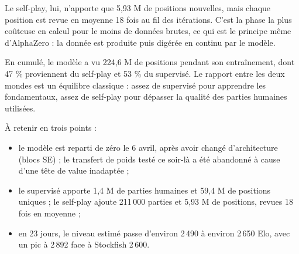 Le self-play, lui, n'apporte que 5,93 M de positions nouvelles, mais chaque
position est revue en moyenne 18 fois au fil des itérations. C'est la phase la
plus coûteuse en calcul pour le moins de données brutes, ce qui est le
principe même d'AlphaZero : la donnée est produite puis digérée en continu par
le modèle.

En cumulé, le modèle a vu 224,6 M de positions pendant son entraînement, dont
47 \% proviennent du self-play et 53 \% du supervisé. Le rapport entre les deux
mondes est un équilibre classique : assez de supervisé pour apprendre les
fondamentaux, assez de self-play pour dépasser la qualité des parties
humaines utilisées.

\begin{resume}
À retenir en trois points :
\begin{itemize}[leftmargin=1.1em,itemsep=1pt,topsep=2pt]
  \item le modèle est reparti de zéro le 6 avril, après avoir changé
        d'architecture (blocs SE) ; le transfert de poids testé ce soir-là a
        été abandonné à cause d'une tête de value inadaptée ;
  \item le supervisé apporte 1,4 M de parties humaines et 59,4 M de positions
        uniques ; le self-play ajoute 211\,000 parties et 5,93 M de positions,
        revues 18 fois en moyenne ;
  \item en 23 jours, le niveau estimé passe d'environ 2\,490 à environ
        2\,650 Elo, avec un pic à 2\,892 face à Stockfish 2\,600.
\end{itemize}
\end{resume}
